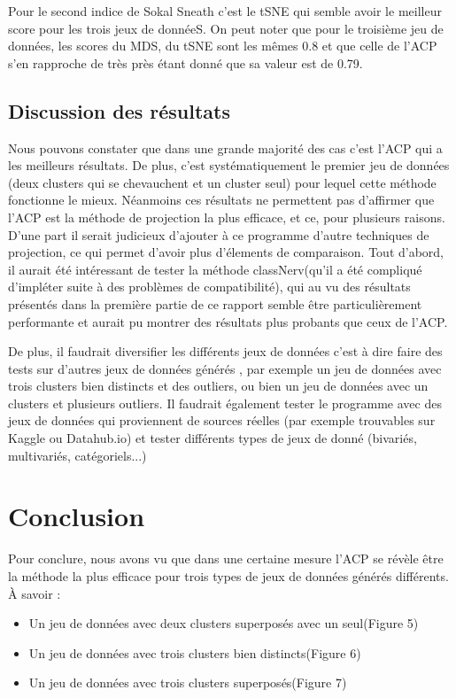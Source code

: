 Pour le second indice de Sokal Sneath c'est le tSNE qui semble avoir le meilleur score pour les trois jeux de donnéeS.
On peut noter que pour le troisième jeu de données, les scores du MDS, du tSNE sont les mêmes 0.8 et que celle de l'ACP s'en rapproche de très près étant donné que sa valeur est de 0.79.

\subsection{Discussion des résultats}
Nous pouvons constater que dans une grande majorité des cas c'est l'ACP qui a les meilleurs résultats. De plus, c'est systématiquement le premier jeu de données
(deux clusters qui se chevauchent et un cluster seul) pour lequel cette méthode fonctionne le mieux.
Néanmoins ces résultats ne permettent pas d'affirmer que l'ACP est la méthode de projection la plus efficace, et ce, pour plusieurs raisons.
D'une part il serait judicieux d'ajouter à ce programme d'autre techniques de projection, ce qui permet d'avoir plus d'élements de comparaison.
Tout d'abord, il aurait été intéressant de tester la méthode classNerv(qu'il a été compliqué d'impléter suite à des problèmes de compatibilité), qui au vu des résultats présentés dans la première partie de ce rapport
semble être particulièrement performante et aurait pu montrer des résultats plus probants que ceux de l'ACP. 

De plus, il faudrait diversifier les différents jeux de données c'est à dire faire des tests sur d'autres jeux de données générés , par exemple
un jeu de données avec trois clusters bien distincts et des outliers, ou bien un jeu de données avec un clusters et plusieurs outliers.
Il faudrait également tester le programme avec des jeux de données qui proviennent de sources réelles (par exemple trouvables sur Kaggle ou Datahub.io) et tester différents types
de jeux de donné (bivariés, multivariés, catégoriels...)


\section{Conclusion}
Pour conclure, nous avons vu que dans une certaine mesure l'ACP se révèle être la méthode la plus efficace pour trois types de jeux de données générés différents. À savoir :
\begin{itemize}
    \item Un jeu de données avec deux clusters superposés avec un seul(Figure 5)
    \item Un jeu de données avec trois clusters bien distincts(Figure 6)
    \item Un jeu de données avec trois clusters superposés(Figure 7)
\end{itemize}

